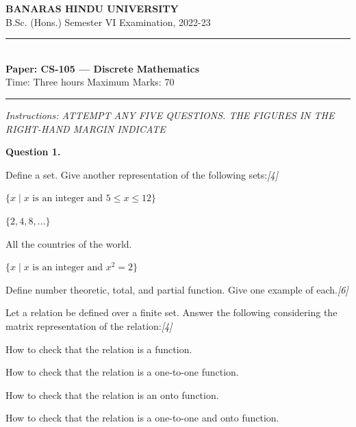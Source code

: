 \documentclass[11pt,a4paper]{article}
\newcommand{\pts}[1]{\hfill   \textit{[#1]}}
\begin{document}
\begin{center}
  {\large\bfseries BANARAS HINDU UNIVERSITY}\\[2pt]
  {\normalsize B.Sc. (Hons.) Semester VI Examination, 2022-23}\\[6pt]
  \rule{0.8\linewidth}{0.5pt}\\[6pt]
  {\large\bfseries Paper: CS-105 --- Discrete Mathematics}\\[4pt]
  {\normalsize Time: Three hours \hfill Maximum Marks: 70}
\end{center}

\rule{\linewidth}{0.4pt}

\smallskip



\noindent   \textit{Instructions: ATTEMPT ANY FIVE QUESTIONS. THE FIGURES IN THE RIGHT-HAND MARGIN INDICATE}

\bigskip

\medskip


\noindent   \textbf{Question 1.}

\begin{parts}
  \item Define a set. Give another representation of the following sets:\pts{4}
  
\begin{parts}
    \item $\{x \mid x  \text{ is an integer and } 5 \le x \le 12\}$
    \item $\{2, 4, 8, \dots\}$
    \item All the countries of the world.
    \item $\{x \mid x  \text{ is an integer and } x^2 = 2\}$
  \end{parts}
  \item Define number theoretic, total, and partial function. Give one example of each.\pts{6}
  \item Let a relation be defined over a finite set. Answer the following considering the matrix representation of the relation:\pts{4}
  
\begin{parts}
    \item How to check that the relation is a function.
    \item How to check that the relation is a one-to-one function.
    \item How to check that the relation is an onto function.
    \item How to check that the relation is a one-to-one and onto function.
  \end{parts}
\end{parts}
\end{document}
